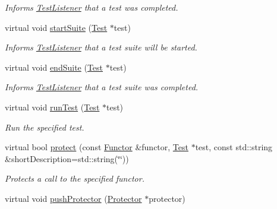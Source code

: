 \begin{DoxyCompactItemize}
\begin{DoxyCompactList}\small\item\em Informs \hyperlink{class_test_listener}{Test\-Listener} that a test was completed. \end{DoxyCompactList}\item 
\hypertarget{class_test_result_a9e21095aa704141c285819b99785326f}{virtual void \hyperlink{class_test_result_a9e21095aa704141c285819b99785326f}{start\-Suite} (\hyperlink{class_test}{Test} $\ast$test)}\label{class_test_result_a9e21095aa704141c285819b99785326f}

\begin{DoxyCompactList}\small\item\em Informs \hyperlink{class_test_listener}{Test\-Listener} that a test suite will be started. \end{DoxyCompactList}\item 
\hypertarget{class_test_result_acacd853a4392a0473b3407051d79d471}{virtual void \hyperlink{class_test_result_acacd853a4392a0473b3407051d79d471}{end\-Suite} (\hyperlink{class_test}{Test} $\ast$test)}\label{class_test_result_acacd853a4392a0473b3407051d79d471}

\begin{DoxyCompactList}\small\item\em Informs \hyperlink{class_test_listener}{Test\-Listener} that a test suite was completed. \end{DoxyCompactList}\item 
virtual void \hyperlink{class_test_result_ae00af1cdee85b14923b80a01678478ee}{run\-Test} (\hyperlink{class_test}{Test} $\ast$test)
\begin{DoxyCompactList}\small\item\em Run the specified test. \end{DoxyCompactList}\item 
virtual bool \hyperlink{class_test_result_a243b3097a3d9468abc61e7910bbaa8b7}{protect} (const \hyperlink{class_functor}{Functor} \&functor, \hyperlink{class_test}{Test} $\ast$test, const std\-::string \&short\-Description=std\-::string(\char`\"{}\char`\"{}))
\begin{DoxyCompactList}\small\item\em Protects a call to the specified functor. \end{DoxyCompactList}\item 
\hypertarget{class_test_result_a1a4fbbca38cb73e8e00905193b7593dc}{virtual void \hyperlink{class_test_result_a1a4fbbca38cb73e8e00905193b7593dc}{push\-Protector} (\hyperlink{class_protector}{Protector} $\ast$protector)}\label{class_test_result_a1a4fbbca38cb73e8e00905193b7593dc}


\end{DoxyCompactItemize}
